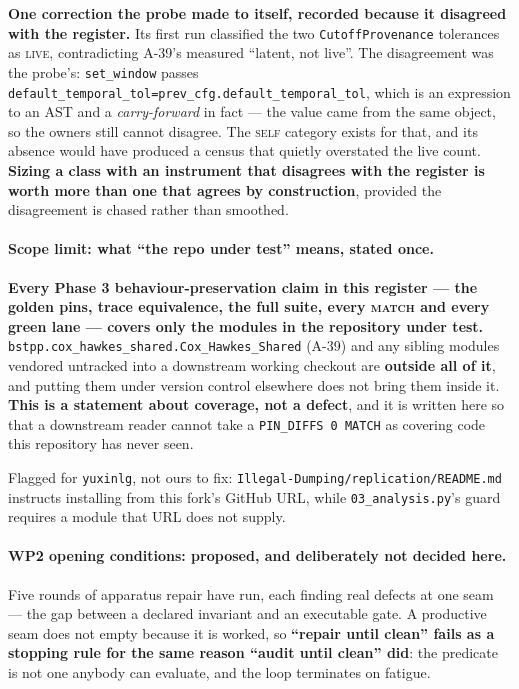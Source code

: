 \documentclass[
  10pt,
]{article}
\begin{document}
\textbf{One correction the probe made to itself, recorded because it disagreed with the register.} Its first run classified the two \texttt{CutoffProvenance} tolerances as \textsc{live}, contradicting A-39's measured ``latent, not live''. The disagreement was the probe's: \texttt{set\_window} passes \texttt{default\_temporal\_tol=prev\_cfg.default\_temporal\_tol}, which is an expression to an AST and a \emph{carry-forward} in fact --- the value came from the same object, so the owners still cannot disagree. The \textsc{self} category exists for that, and its absence would have produced a census that quietly overstated the live count. \textbf{Sizing a class with an instrument that disagrees with the register is worth more than one that agrees by construction}, provided the disagreement is chased rather than smoothed.

\paragraph{Scope limit: what ``the repo under test'' means, stated once.}
\textbf{Every Phase 3 behaviour-preservation claim in this register --- the golden pins, trace equivalence, the full suite, every \textsc{match} and every green lane --- covers only the modules in the repository under test.} \texttt{bstpp.cox\_hawkes\_shared.Cox\_Hawkes\_Shared} (A-39) and any sibling modules vendored untracked into a downstream working checkout are \textbf{outside all of it}, and putting them under version control elsewhere does not bring them inside it. \textbf{This is a statement about coverage, not a defect}, and it is written here so that a downstream reader cannot take a \texttt{PIN\_DIFFS 0 MATCH} as covering code this repository has never seen.

Flagged for \texttt{yuxinlg}, not ours to fix: \texttt{Illegal-Dumping/\allowbreak{}replication/\allowbreak{}README.md} instructs installing from this fork's GitHub URL, while \texttt{03\_analysis.py}'s guard requires a module that URL does not supply.

\paragraph{WP2 opening conditions: proposed, and deliberately not decided here.}
Five rounds of apparatus repair have run, each finding real defects at one seam --- the gap between a declared invariant and an executable gate. A productive seam does not empty because it is worked, so \textbf{``repair until clean'' fails as a stopping rule for the same reason ``audit until clean'' did}: the predicate is not one anybody can evaluate, and the loop terminates on fatigue.
\end{document}
